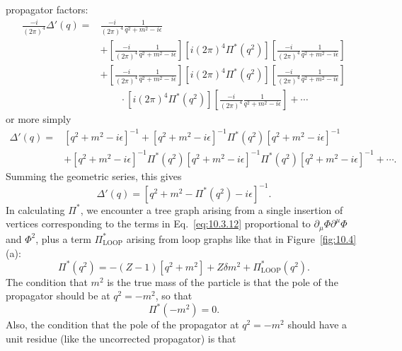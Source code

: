 

propagator factors:
\begin{equation}
\begin{split}
\frac{-i}{(2\pi)^4}\Delta'(q)={}&
\frac{-i}{(2\pi)^4}\frac{1}{q^2+m^2-i\epsilon}
\\
&+\left[\frac{-i}{(2\pi)^4}\frac{1}{q^2+m^2-i\epsilon}\right]
[i(2\pi)^4\Pi^*(q^2)]
\left[\frac{-i}{(2\pi)^4}\frac{1}{q^2+m^2-i\epsilon}\right]
\\
&+\left[\frac{-i}{(2\pi)^4}\frac{1}{q^2+m^2-i\epsilon}\right]
[i(2\pi)^4\Pi^*(q^2)]
\left[\frac{-i}{(2\pi)^4}\frac{1}{q^2+m^2-i\epsilon}\right]
\\
&\qquad\cdot[i(2\pi)^4\Pi^*(q^2)]
\left[\frac{-i}{(2\pi)^4}\frac{1}{q^2+m^2-i\epsilon}\right]+\cdots
\end{split}
\tag{10.3.13}\label{eq:10.3.13}
\end{equation}
or more simply
\begin{equation}
\begin{split}
\Delta'(q)={}&[q^2+m^2-i\epsilon]^{-1}
+[q^2+m^2-i\epsilon]^{-1}\Pi^*(q^2)[q^2+m^2-i\epsilon]^{-1}
\\
&+[q^2+m^2-i\epsilon]^{-1}\Pi^*(q^2)[q^2+m^2-i\epsilon]^{-1}
\Pi^*(q^2)[q^2+m^2-i\epsilon]^{-1}+\cdots.
\end{split}
\tag{10.3.14}\label{eq:10.3.14}
\end{equation}
Summing the geometric series, this gives
\begin{equation}
\Delta'(q)=[q^2+m^2-\Pi^*(q^2)-i\epsilon]^{-1}.
\tag{10.3.15}\label{eq:10.3.15}
\end{equation}
In calculating $\Pi^*$, we encounter a tree graph arising from a single
insertion of vertices corresponding to the terms in Eq.~\eqref{eq:10.3.12}
proportional to $\partial_\mu\Phi\partial^\mu\Phi$ and $\Phi^2$, plus a term
$\Pi^*_{\mathrm{LOOP}}$ arising from loop graphs like that in
Figure~\ref{fig:10.4}(a):
\begin{equation}
\Pi^*(q^2)=-(Z-1)[q^2+m^2]+Z\delta m^2+\Pi^*_{\mathrm{LOOP}}(q^2).
\tag{10.3.16}\label{eq:10.3.16}
\end{equation}
The condition that $m^2$ is the true mass of the particle is that the pole of
the propagator should be at $q^2=-m^2$, so that
\begin{equation}
\Pi^*(-m^2)=0.
\tag{10.3.17}\label{eq:10.3.17}
\end{equation}
Also, the condition that the pole of the propagator at $q^2=-m^2$ should have
a unit residue (like the uncorrected propagator) is that
